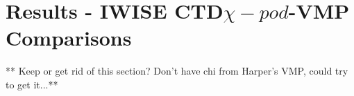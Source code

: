 \documentclass{ametsoc}
\begin{document}
%
\section{Results - IWISE CTD$\chi -pod$-VMP Comparisons}
%
** Keep or get rid of this section? Don't have chi from Harper's VMP, could try to get it...**
%
%
%
%
%
%
%
%
\end{document}
